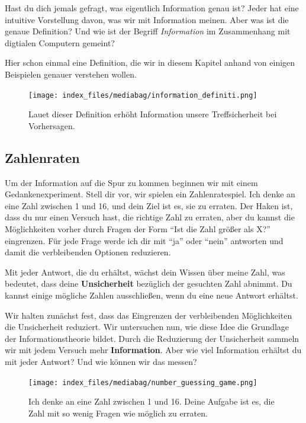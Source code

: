 \documentclass[
  letterpaper,
  DIV=11]{scrreprt}
\begin{document}
Hast du dich jemals gefragt, was eigentlich Information genau ist? Jeder
hat eine intuitive Vorstellung davon, was wir mit Information meinen.
Aber was ist die genaue Definition? Und wie ist der Begriff
\emph{Information} im Zusammenhang mit digtialen Computern gemeint?

Hier schon einmal eine Definition, die wir in diesem Kapitel anhand von
einigen Beispielen genauer verstehen wollen.

\begin{figure}[H]

{\centering \texttt{[image: index\_files/mediabag/information\_definiti.png]}

}

\caption{Lauet dieser Definition erhöht Information unsere
Treffsicherheit bei Vorhersagen.}

\end{figure}%

\subsection{Zahlenraten}\label{zahlenraten}

Um der Information auf die Spur zu kommen beginnen wir mit einem
Gedankenexperiment. Stell dir vor, wir spielen ein Zahlenratespiel. Ich
denke an eine Zahl zwischen 1 und 16, und dein Ziel ist es, sie zu
erraten. Der Haken ist, dass du nur einen Versuch hast, die richtige
Zahl zu erraten, aber du kannst die Möglichkeiten vorher durch Fragen
der Form ``Ist die Zahl größer als X?'' eingrenzen. Für jede Frage werde
ich dir mit ``ja'' oder ``nein'' antworten und damit die verbleibenden
Optionen reduzieren.

Mit jeder Antwort, die du erhältst, wächst dein Wissen über meine Zahl,
was bedeutet, dass deine \textbf{Unsicherheit} bezüglich der gesuchten
Zahl abnimmt. Du kannst einige mögliche Zahlen ausschließen, wenn du
eine neue Antwort erhältst.

Wir halten zunächst fest, dass das Eingrenzen der verbleibenden
Möglichkeiten die Unsicherheit reduziert. Wir untersuchen nun, wie diese
Idee die Grundlage der Informationstheorie bildet. Durch die Reduzierung
der Unsicherheit sammeln wir mit jedem Versuch mehr
\textbf{Information}. Aber wie viel Information erhältst du mit jeder
Antwort? Und wie können wir das messen?

\begin{figure}[H]

{\centering \texttt{[image: index\_files/mediabag/number\_guessing\_game.png]}

}

\caption{Ich denke an eine Zahl zwischen 1 und 16. Deine Aufgabe ist es,
die Zahl mit so wenig Fragen wie möglich zu erraten.}

\end{figure}%
\end{document}
